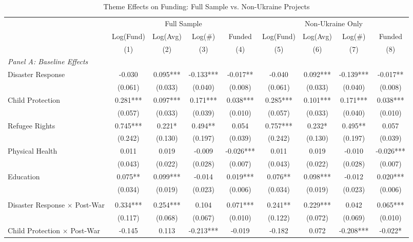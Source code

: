 \begin{table}[htbp]
\centering
\caption{Theme Effects on Funding: Full Sample vs. Non-Ukraine Projects}
\label{tab:themes}
\begin{threeparttable}
\small
\begin{tabular}{lcccccccc}
\toprule
& \multicolumn{4}{c}{Full Sample} & \multicolumn{4}{c}{Non-Ukraine Only} \\
\cmidrule(lr){2-5} \cmidrule(lr){6-9}
& Log(Fund) & Log(Avg) & Log(\#) & Funded & Log(Fund) & Log(Avg) & Log(\#) & Funded \\
& (1) & (2) & (3) & (4) & (5) & (6) & (7) & (8) \\
\midrule
\multicolumn{9}{l}{\textit{Panel A: Baseline Effects}} \\
Disaster Response & -0.030 & 0.095*** & -0.133*** & -0.017** & -0.040 & 0.092*** & -0.139*** & -0.017** \\
& (0.061) & (0.033) & (0.040) & (0.008) & (0.061) & (0.033) & (0.040) & (0.008) \\
Child Protection & 0.281*** & 0.097*** & 0.171*** & 0.038*** & 0.285*** & 0.101*** & 0.171*** & 0.038*** \\
& (0.057) & (0.033) & (0.039) & (0.010) & (0.057) & (0.033) & (0.040) & (0.010) \\
Refugee Rights & 0.745*** & 0.221* & 0.494** & 0.054 & 0.757*** & 0.232* & 0.495** & 0.057 \\
& (0.242) & (0.130) & (0.197) & (0.039) & (0.242) & (0.130) & (0.197) & (0.039) \\
Physical Health & 0.011 & 0.019 & -0.009 & -0.026*** & 0.011 & 0.019 & -0.010 & -0.026*** \\
& (0.043) & (0.022) & (0.028) & (0.007) & (0.043) & (0.022) & (0.028) & (0.007) \\
Education & 0.075** & 0.099*** & -0.014 & 0.019*** & 0.076** & 0.098*** & -0.012 & 0.020*** \\
& (0.034) & (0.019) & (0.023) & (0.006) & (0.034) & (0.019) & (0.023) & (0.006) \\
\addlinespace
\multicolumn{9}{l}{\textit{Panel B: Post-War Interactions}} \\
Disaster Response $\times$ Post-War & 0.334*** & 0.254*** & 0.104 & 0.071*** & 0.241** & 0.229*** & 0.042 & 0.065*** \\
& (0.117) & (0.068) & (0.067) & (0.010) & (0.122) & (0.072) & (0.069) & (0.010) \\
Child Protection $\times$ Post-War & -0.145 & 0.113 & -0.213*** & -0.019 & -0.182 & 0.072 & -0.208*** & -0.022* \\

\end{tabular}
\end{threeparttable}
\end{table}
